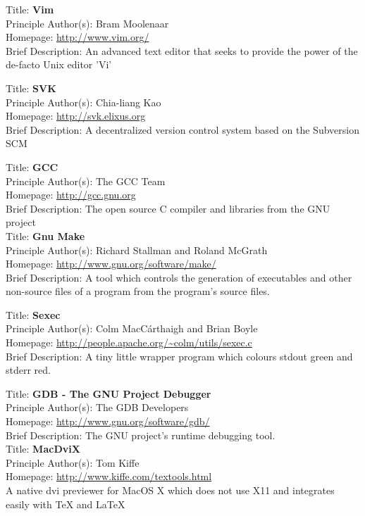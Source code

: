
Title: 	\textbf{Vim}	\\
Principle Author(s): 	Bram Moolenaar	\\
Homepage: 	\url{http://www.vim.org/}	\\	
Brief Description: 		An advanced text editor that seeks to provide the power of the 
de-facto Unix editor 'Vi'


Title:		\textbf{SVK}	\\
Principle Author(s): 	Chia-liang Kao	\\
Homepage:		\url{http://svk.elixus.org}	\\
Brief Description:		A decentralized version control system based on the Subversion
SCM


Title:		\textbf{GCC}	\\	
Principle Author(s): 	The GCC Team	\\
Homepage:		\url{http://gcc.gnu.org}	\\
Brief Description:		The open source C compiler and libraries from the GNU project \\


Title:		\textbf{Gnu Make}	\\
Principle Author(s): 	Richard Stallman and Roland McGrath	\\
Homepage:		\url{http://www.gnu.org/software/make/} \\
Brief Description:		A tool which controls the generation of executables and other
non-source files of a program from the program's source files.


Title: 		\textbf{Sexec}	\\
Principle Author(s): 	Colm MacC\'{a}rthaigh and Brian Boyle	\\
Homepage:		\url{http://people.apache.org/~colm/utils/sexec.c} \\
Brief Description:		A tiny little wrapper program which colours stdout green 
and stderr red.


Title:		\textbf{GDB - The GNU Project Debugger}	\\	
Principle Author(s): 	The GDB Developers	\\
Homepage:		\url{http://www.gnu.org/software/gdb/}	\\
Brief Description: The GNU project's runtime debugging tool. \\


Title:		\textbf{MacDviX}	\\	
Principle Author(s): 	Tom Kiffe \\
Homepage:		\url{http://www.kiffe.com/textools.html}	\\
A native dvi previewer for MacOS X which does not use X11 and 
integrates easily with \textrm{\TeX{}} and \textrm{\LaTeX{}} \\


